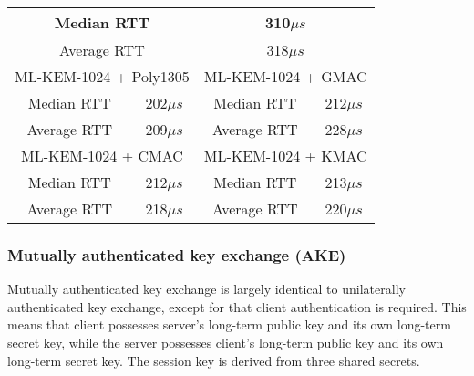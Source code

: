 \documentclass[floatrow,journal=tches,submission]{iacrtrans}
\newcommand{\us}{\mu s}
\begin{document}
\begin{table}[H]
\begin{tabular}{|c|c|c|c|}
        \multicolumn{2}{|c|}{Median RTT}
        & \multicolumn{2}{|c|}{310$\us$} \\
        \hline
        \multicolumn{2}{|c|}{Average RTT}
        & \multicolumn{2}{|c|}{318$\us$} \\
        \hline\hline
        \multicolumn{2}{|c|}{ML-KEM-1024 + Poly1305}
        & \multicolumn{2}{|c|}{ML-KEM-1024 + GMAC} \\
        \hline
        Median RTT & 202$\us$ & Median RTT & 212$\us$ \\
        \hline
        Average RTT & 209$\us$ & Average RTT & 228$\us$ \\
        \hline\hline
        \multicolumn{2}{|c|}{ML-KEM-1024 + CMAC}
        & \multicolumn{2}{|c|}{ML-KEM-1024 + KMAC} \\
        \hline
        Median RTT & 212$\us$ & Median RTT & 213$\us$ \\
        \hline
        Average RTT & 218$\us$ & Average RTT & 220$\us$ \\
        \hline
    \end{tabular}
\end{table}

\subsubsection{Mutually authenticated key exchange (AKE)}\label{sec:akex}
Mutually authenticated key exchange is largely identical to unilaterally authenticated key exchange, except for that client authentication is required. This means that client possesses server's long-term public key and its own long-term secret key, while the server possesses client's long-term public key and its own long-term secret key. The session key is derived from three shared secrets.
\end{document}
